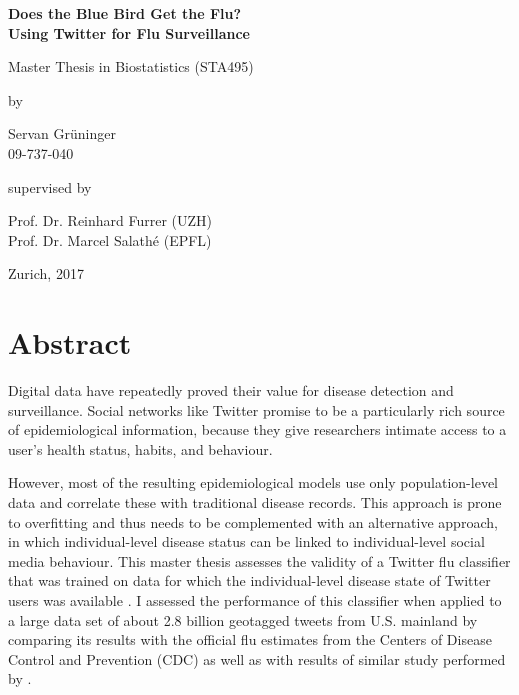 \documentclass[11pt, a4paper,twoside]{report}\usepackage[]{graphicx}\usepackage[]{color}
\renewcommand\familydefault{\sfdefault}
\newcommand{\bigtitle}{Does the Blue Bird Get the Flu?}
\newcommand{\subtitle}{Using Twitter for Flu Surveillance}
\newcommand{\mytitle}[3]{}
\begin{document}
\renewcommand{\baselinestretch}{1.5}\normalfont
\begin{center}
\setlength{\parindent}{0cm}
\bf\Large%
Does the Blue Bird Get the Flu?\\
Using Twitter for Flu Surveillance
\normalfont



\hrulefill

\vspace*{4cm}

\large
Master Thesis in Biostatistics (STA495)
\vspace*{12mm}

by

\vspace*{12mm}

Servan Grüninger\\
\small 09-737-040\\
\normalfont
\vspace*{4cm}

supervised by

\vspace*{1cm}

Prof. Dr. Reinhard Furrer (UZH)\\
Prof. Dr. Marcel Salathé (EPFL)

\vfill

Zurich, 2017
\end{center}
\renewcommand\familydefault{\rmdefault}\normalfont%
\setcounter{page}{0}
\thispagestyle{empty}
\cleardoublepage


\pagestyle{standard}


\chapter*{Abstract}
Digital data have repeatedly proved their value for disease detection and surveillance. Social networks like Twitter promise to be a particularly rich source of epidemiological information, because they give researchers intimate access to a user's health status, habits, and behaviour. 

However, most of the resulting epidemiological models use only population-level data and correlate these with traditional disease records. This approach is prone to overfitting and thus needs to be complemented with an alternative approach, in which individual-level disease status can be linked to individual-level social media behaviour. This master thesis assesses the validity of a Twitter flu classifier that was trained on data for which the individual-level disease state of Twitter users was available \citep{bodnar_ground_2014}. I assessed the performance of this classifier when applied to a large data set of about 2.8 billion geotagged tweets from U.S. mainland by comparing its results with the official flu estimates from the Centers of Disease Control and Prevention (CDC) as well as with results of similar study performed by \cite{bodnar_data_2015}. 
\end{document}
